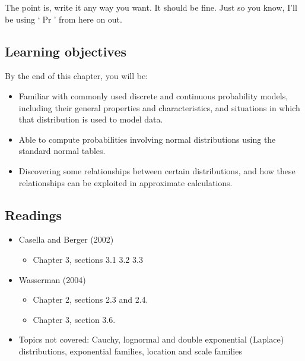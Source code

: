 \documentclass[
]{book}
\providecommand{\tightlist}{%
  \setlength{\itemsep}{0pt}\setlength{\parskip}{0pt}}
\theoremstyle{definition}
\theoremstyle{definition}
\theoremstyle{definition}
\theoremstyle{definition}
\theoremstyle{remark}
\begin{document}
The point is, write it any way you want. It should be fine. Just so you know, I'll be using `\(\Pr\)' from here on out.

\hypertarget{learning-objectives-1}{%
\subsection*{Learning objectives}\label{learning-objectives-1}}

By the end of this chapter, you will be:

\begin{itemize}
\tightlist
\item
  Familiar with commonly used discrete and continuous probability models, including their general properties and characteristics, and situations in which that distribution is used to model data.
\item
  Able to compute probabilities involving normal distributions using the standard normal tables.
\item
  Discovering some relationships between certain distributions, and how these relationships can be exploited in approximate calculations.
\end{itemize}

\hypertarget{readings-1}{%
\subsection*{Readings}\label{readings-1}}

\begin{itemize}
\tightlist
\item
  Casella and Berger (2002)

  \begin{itemize}
  \tightlist
  \item
    Chapter 3, sections 3.1 3.2 3.3
  \end{itemize}
\item
  Wasserman (2004)

  \begin{itemize}
  \tightlist
  \item
    Chapter 2, sections 2.3 and 2.4.
  \item
    Chapter 3, section 3.6.
  \end{itemize}
\item
  Topics not covered: Cauchy, lognormal and double exponential (Laplace) distributions, exponential families, location and scale families
\end{itemize}
\end{document}
